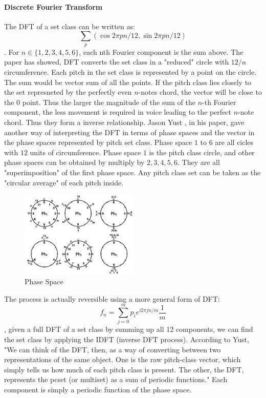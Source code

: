 \paragraph*{Discrete Fourier Transform}
The DFT of a set class can be written as:
\[\sum_p (\cos 2\pi pn/12, \sin 2\pi pn/12)\].
For $n\in \{1,2,3,4,5,6\}$, each nth Fourier component is the sum above.
The paper has showed, DFT converts the set class in a "reduced" circle with 
$12/n$ circumference. Each pitch in the set class is represented by a point
on the circle. The sum would be vector sum of all the points. If the pitch 
class lies closely to the set represneted by the perfectly even $n$-notes chord,
the vector will be close to the $0$ point. Thus the larger the magnitude of the
sum of the $n$-th Fourier component, the less movement is required in voice 
leading to the perfect $n$-note chord. Thus they form a inverse relationship.
Jason Yust , in his paper, gave another way of interpreting the DFT in terms of 
phase spaces and the vector in the phase spaces represented by pitch set class. Phase space $1$ to $6$
are all cicles with $12$ units of circumference. Phase space $1$ is the pitch class
circle, and other phase spaces can be obtained by multiply by $2,3,4,5,6$. They are
all "superimposition" of the first phase space. Any pitch class set can be taken as
the "circular average" of each pitch inside.
\begin{figure}[h]
    \centering
    \includegraphics[width=0.5\textwidth]{ph_s.png}
    \caption{Phase Space}
\end{figure}
The process is actually reversible using a more general form of DFT:
\[f_n = \sum_{j=0}^{m} p_i e^{i2\pi jn/m}\frac{1}{m}\], given a full DFT
of a set class by summing up all 12 components, we can find the set class 
by applying the IDFT (inverse DFT process). According to Yust, 
"We can think of the DFT, then, as a way of converting between two 
representations of the same object. One is the raw pitch-class vector, 
which simply tells us how much of each pitch class is present. 
The other, the DFT, represents the pcset (or multiset) as a sum of 
periodic functions." Each component is simply a periodic function of
the phase space. 
